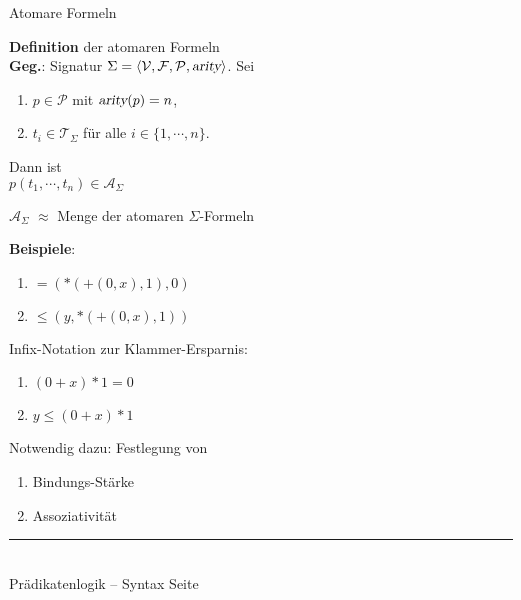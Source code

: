 \documentclass{slides}
\newcommand{\myrule}{\rule{20cm}{1mm}\\ }
\newcounter{mypage}
\begin{document}
\begin{slide}{}
\normalsize
\begin{center}
Atomare Formeln
\end{center}
\vspace{0.5cm}

\footnotesize
\textbf{Definition} der atomaren Formeln \\[0.1cm]
\textbf{Geg.}: Signatur $\Sigma = \langle \mathcal{V}, \mathcal{F}, \mathcal{P},
\textsl{arity}\rangle$. \quad Sei
\begin{enumerate}
\item  $p \in \mathcal{P}$ \quad mit \quad $\textsl{arity}(p) = n$,
\item  $t_i \in \mathcal{T}_{\Sigma}$ \quad f\"{u}r alle $i\in\{1,\cdots,n\}$. 
\end{enumerate}
Dann ist \\[0.3cm]
\hspace*{1.3cm}  $p(t_1, \cdots, t_n) \in \mathcal{A}_\Sigma$ 

\begin{center}
{\normalsize
  $\mathcal{A}_\Sigma$  $\approx$ Menge der atomaren $\Sigma$-Formeln}
\end{center}

\textbf{Beispiele}:
\begin{enumerate}
\item $\mathtt{=}(\mathtt{*}(\mathtt{+}(0,x),1),0)$ 
\item $\leq(y,\mathtt{*}(\mathtt{+}(0,x),1))$ 
\end{enumerate}

Infix-Notation zur Klammer-Ersparnis:
\begin{enumerate}
\item $(0+x)*1 = 0$
\item $y \leq (0+x)*1$ 
\end{enumerate}
Notwendig dazu: Festlegung von 
\begin{enumerate}
\item Bindungs-St\"{a}rke
\item Assoziativit\"{a}t
\end{enumerate}

\vspace*{\fill}
\tiny \addtocounter{mypage}{1}
\myrule
Pr\"{a}dikatenlogik -- Syntax  \hspace*{\fill} Seite 
\end{slide}

\end{document}
